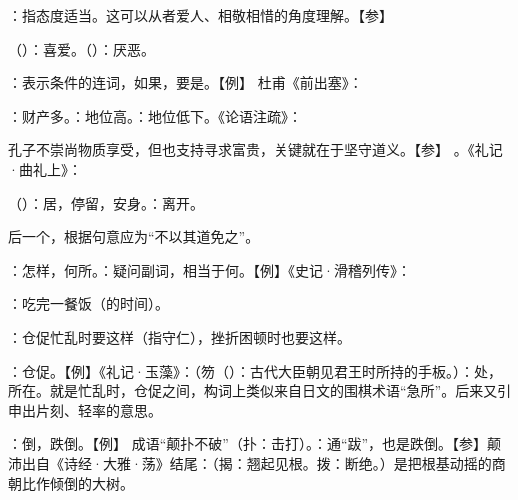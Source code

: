 {
\item {}：指态度适当。这可以从者爱人、相敬相惜的角度理解。【参】 
\item {}（）：喜爱。（）：厌恶。
}
{}


{
\item {}：表示条件的连词，如果，要是。【例】 杜甫《前出塞》：
}
{}


{
\item {}：财产多。：地位高。：地位低下。《论语注疏》：

孔子不崇尚物质享受，但也支持寻求富贵，关键就在于坚守道义。【参】  。《礼记·曲礼上》：
\item {}（）：居，停留，安身。：离开。
\item 后一个，根据句意应为“不以其道免之”。
\item {}：怎样，何所。：疑问副词，相当于何。【例】《史记·滑稽列传》：
\item {}：吃完一餐饭（的时间）。
\item {}：仓促忙乱时要这样（指守仁），挫折困顿时也要这样。

：仓促。【例】《礼记·玉藻》：（笏（）：古代大臣朝见君王时所持的手板。）：处，所在。就是忙乱时，仓促之间，构词上类似来自日文的围棋术语“急所”。后来又引申出片刻、轻率的意思。

：倒，跌倒。【例】 成语“颠扑不破”（扑：击打）。：通“跋”，也是跌倒。【参】颠沛出自《诗经·大雅·荡》结尾：（揭：翘起见根。拨：断绝。）是把根基动摇的商朝比作倾倒的大树。
}  %
{}


